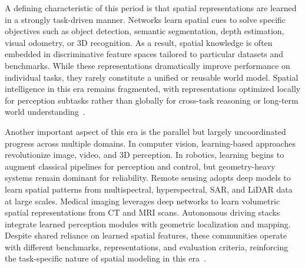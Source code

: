 A defining characteristic of this period is that spatial representations are learned in a strongly task-driven manner.
Networks learn spatial cues to solve specific objectives such as object detection, semantic segmentation, depth estimation, visual odometry, or 3D recognition.
As a result, spatial knowledge is often embedded in discriminative feature spaces tailored to particular datasets and benchmarks.
While these representations dramatically improve performance on individual tasks, they rarely constitute a unified or reusable world model.
Spatial intelligence in this era remains fragmented, with representations optimized locally for perception subtasks rather than globally for cross-task reasoning or long-term world understanding~\cite{long2015fcn,ren2015faster,zhou2017unsupervised}.



Another important aspect of this era is the parallel but largely uncoordinated progress across multiple domains.
In computer vision, learning-based approaches revolutionize image, video, and 3D perception.
In robotics, learning begins to augment classical pipelines for perception and control, but geometry-heavy systems remain dominant for reliability.
Remote sensing adopts deep models to learn spatial patterns from multispectral, hyperspectral, SAR, and LiDAR data at large scales.
Medical imaging leverages deep networks to learn volumetric spatial representations from CT and MRI scans.
Autonomous driving stacks integrate learned perception modules with geometric localization and mapping.
Despite shared reliance on learned spatial features, these communities operate with different benchmarks, representations, and evaluation criteria, reinforcing the task-specific nature of spatial modeling in this era~\cite{KITTI-GeigerLU12,ronneberger2015unet,Levine2016DeepGrasp}.




